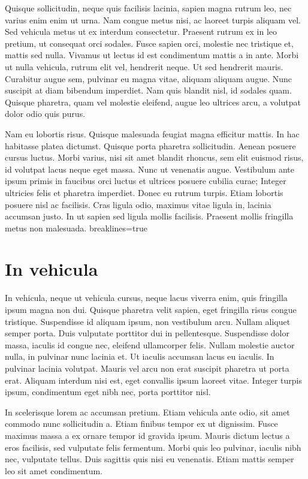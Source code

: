 \documentclass[12pt]{article} %
\begin{document}
Quisque sollicitudin, neque quis facilisis lacinia, sapien magna rutrum leo, nec varius enim enim ut
urna. Nam congue metus nisi, ac laoreet turpis aliquam vel. Sed vehicula metus ut ex interdum
consectetur. Praesent rutrum ex in leo pretium, ut consequat orci sodales. Fusce sapien orci, molestie
nec tristique et, mattis sed nulla. Vivamus ut lectus id est condimentum mattis a in ante. Morbi ut
nulla vehicula, rutrum elit vel, hendrerit neque. Ut sed hendrerit mauris. Curabitur augue sem,
pulvinar eu magna vitae, aliquam aliquam augue. Nunc suscipit at diam bibendum imperdiet. Nam quis
blandit nisl, id sodales quam. Quisque pharetra, quam vel molestie eleifend, augue leo ultrices arcu,
a volutpat dolor odio quis purus.

Nam eu lobortis risus. Quisque malesuada feugiat magna efficitur mattis. In hac habitasse platea
dictumst. Quisque porta pharetra sollicitudin. Aenean posuere cursus luctus. Morbi varius, nisi sit
amet blandit rhoncus, sem elit euismod risus, id volutpat lacus neque eget massa. Nunc ut venenatis
augue. Vestibulum ante ipsum primis in faucibus orci luctus et ultrices posuere cubilia curae; Integer
ultricies felis et pharetra imperdiet. Donec eu rutrum turpis. Etiam lobortis posuere nisl ac
facilisis. Cras ligula odio, maximus vitae ligula in, lacinia accumsan justo. In ut sapien sed ligula
mollis facilisis. Praesent mollis fringilla metus non malesuada.
breaklines=true
\section{In vehicula}

In vehicula, neque ut vehicula cursus, neque lacus viverra enim, quis fringilla ipsum magna non dui.
Quisque pharetra velit sapien, eget fringilla risus congue tristique. Suspendisse id aliquam ipsum,
non vestibulum arcu. Nullam aliquet semper porta. Duis vulputate porttitor dui in pellentesque.
Suspendisse dolor massa, iaculis id congue nec, eleifend ullamcorper felis. Nullam molestie auctor
nulla, in pulvinar nunc lacinia et. Ut iaculis accumsan lacus eu iaculis. In pulvinar lacinia
volutpat. Mauris vel arcu non erat suscipit pharetra ut porta erat. Aliquam interdum nisi est, eget
convallis ipsum laoreet vitae. Integer turpis ipsum, condimentum eget nibh nec, porta porttitor nisl.

In scelerisque lorem ac accumsan pretium. Etiam vehicula ante odio, sit amet commodo nunc sollicitudin
a. Etiam finibus tempor ex ut dignissim. Fusce maximus massa a ex ornare tempor id gravida ipsum.
Mauris dictum lectus a eros facilisis, sed vulputate felis fermentum. Morbi quis leo pulvinar, iaculis
nibh nec, vulputate tellus. Duis sagittis quis nisi eu venenatis. Etiam mattis semper leo sit amet
condimentum.
\end{document}
